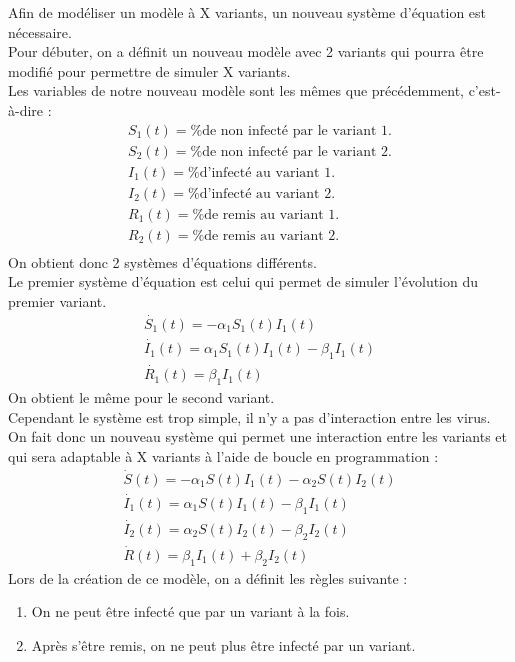 \documentclass{article}
\begin{document}
Afin de modéliser un modèle à X variants, un nouveau système d'équation est nécessaire.\\
Pour débuter, on a définit un nouveau modèle avec 2 variants qui pourra être modifié pour permettre de simuler X variants.\\
\noindent
Les variables de notre nouveau modèle sont les mêmes que précédemment, c'est-à-dire :
\begin{align}
    S_1(t)= \text{\% de non infecté par le variant 1.} \\
    S_2(t)= \text{\% de non infecté par le variant 2.} \\
    I_1(t)= \text{\% d'infecté au variant 1.} \\
    I_2(t)= \text{\% d'infecté au variant 2.} \\
    R_1(t)= \text{\% de remis au variant 1.} \\
    R_2(t)= \text{\% de remis au variant 2.} \\
\end{align}
\noindent
On obtient donc 2 systèmes d'équations différents. \\
\noindent
Le premier système d'équation est celui qui permet de simuler l'évolution du premier variant.\\
\begin{align}
    \dot{S_1}(t)= -\alpha_1 S_1(t)I_1(t) \\
    \dot{I_1}(t)= \alpha_1 S_1(t)I_1(t)-\beta_1 I_1(t) \\
    \dot{R_1}(t)= \beta_1 I_1(t)
\end{align}
On obtient le même pour le second variant. \\
Cependant le système est trop simple, il n'y a pas d'interaction entre les virus. \\
On fait donc un nouveau système qui permet une interaction entre les variants et qui sera adaptable à X variants à l'aide de boucle en programmation :
\begin{align}
    \dot{S}(t)= -\alpha_1 S(t)I_1(t) - \alpha_2 S(t)I_2(t) \\
    \dot{I_1}(t)= \alpha_1 S(t)I_1(t)-\beta_1 I_1(t) \\
    \dot{I_2}(t)= \alpha_2 S(t)I_2(t)-\beta_2 I_2(t) \\
    \dot{R}(t)= \beta_1 I_1(t) + \beta_2 I_2(t)
\end{align}
\noindent
Lors de la création de ce modèle, on a définit les règles suivante : \\
\begin{enumerate}
    \item On ne peut être infecté que par un variant à la fois. \\
    \item Après s'être remis, on ne peut plus être infecté par un variant. \\
\end{enumerate}
\end{document}
